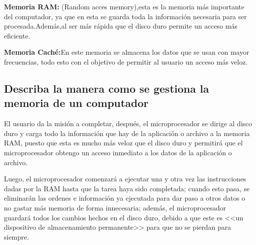 \documentclass{article}
\begin{document}
\textbf{Memoria RAM:} (Random acces memory),esta es la memoria más importante del computador, ya que en esta se guarda toda la información necesaria para ser procesada.Además,al ser más rápida que el disco duro permite un acceso más eficiente.\par

\textbf{Memoria Caché:}En este memoria se almacena los datos que se usan con mayor frecuencias, todo esto con el objetivo de permitir al usuario un acceso más veloz.\par

\subsection{Describa la manera como se gestiona la memoria de un computador}\par
El usuario da la misión a completar, después, el microprocesador se dirige al disco duro y carga todo la información que hay de la aplicación o archivo a la memoria RAM, puesto que esta es mucho más veloz que el disco duro y permitirá que el microprocesador obtengo un acceso inmediato a los datos de la aplicación o archivo.\par
Luego, el microprocesador comenzará a ejecutar una y otra vez las instrucciones dadas por la RAM hasta que la tarea haya sido completada; cuando esto pasa, se eliminarán las ordenes e información ya ejecutada para dar paso a otros datos o no gastar más memoria de forma innecesaria; además, el microprocesador guardará todos los cambios hechos en el disco duro, debido a que este es <<un dispositivo de almacenamiento permanente>> \cite{Salazar} para que no se pierdan para siempre.
\end{document}
